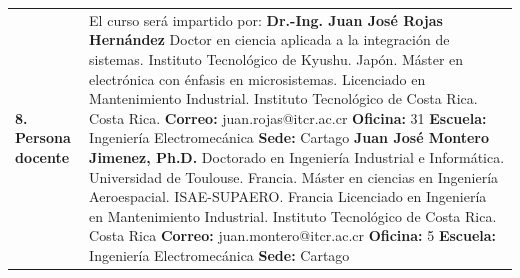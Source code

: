 \documentclass[letterpaper]{article}%
\begin{document}
\begin{tabularx}{\textwidth}{p{3cm}p{13cm}}%
\par\fontsize{12}{14}\selectfont \textbf{\textcolor{parte}{8. Persona docente}}&El curso será impartido por: \vspace*{4mm} \newline \textbf{Dr.{-}Ing. Juan José Rojas Hernández} \vspace*{2mm} \newline Doctor en ciencia aplicada a la integración de sistemas. Instituto Tecnológico de Kyushu. Japón. \vspace*{1mm} \newline Máster en electrónica con énfasis en microsistemas. Licenciado en Mantenimiento Industrial. Instituto Tecnológico de Costa Rica. Costa Rica. \vspace*{1mm} \newline \textbf{Correo:} juan.rojas@itcr.ac.cr\textbf{  Oficina:} 31 \vspace*{1mm} \newline \textbf{Escuela:} Ingeniería Electromecánica\textbf{  Sede:} Cartago \vspace*{4mm} \newline \textbf{Juan José Montero Jimenez, Ph.D.} \vspace*{2mm} \newline Doctorado en Ingeniería Industrial e Informática. Universidad de Toulouse. Francia. \vspace*{1mm} \newline Máster en ciencias en Ingeniería Aeroespacial. ISAE-SUPAERO. Francia \vspace*{1mm} \newline Licenciado en Ingeniería en Mantenimiento Industrial. Instituto Tecnológico de Costa Rica. Costa Rica \vspace*{1mm} \newline \textbf{Correo:} juan.montero@itcr.ac.cr\textbf{  Oficina:} 5 \vspace*{1mm} \newline \textbf{Escuela:} Ingeniería Electromecánica\textbf{  Sede:} Cartago \vspace*{4mm} \newline \\%
\end{tabularx}%
\end{document}
